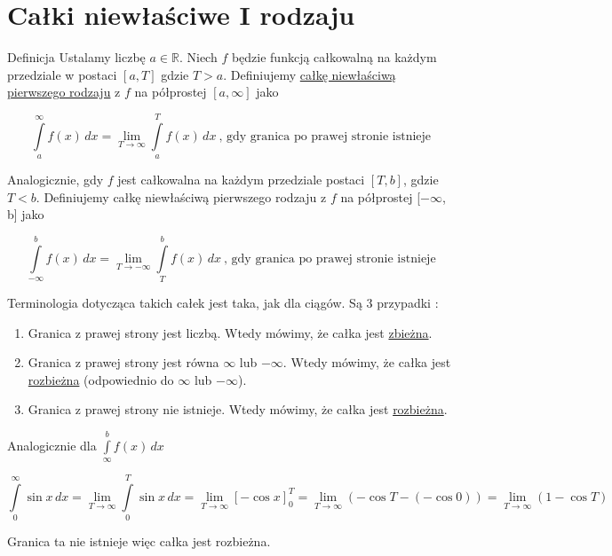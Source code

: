 \chapter{Całki niewłaściwe I rodzaju}

\begin{tw}{Definicja}
    Ustalamy liczbę $a \in \mathbb{R}$. Niech $f$ będzie funkcją całkowalną na każdym przedziale \linebreak w postaci $[a, T]$
    gdzie $T > a$. Definiujemy \underline{całkę niewłaściwą pierwszego rodzaju} z $f$ na półprostej $[a, \infty]$ jako

    \[ \int\limits_{a}^{\infty} f(x) \,dx = \lim_{T \to \infty} \int\limits_{a}^{T} f(x) \,dx \ \text{,  gdy granica po prawej stronie istnieje} \]

    Analogicznie, gdy $f$ jest całkowalna na każdym przedziale postaci $[T, b]$, gdzie $T < b$. Definiujemy całkę niewłaściwą
    pierwszego rodzaju z $f$ na półprostej [$-\infty$, b] jako

    \[ \int\limits_{-\infty}^{b} f(x) \,dx = \lim_{T \to -\infty} \int\limits_{T}^{b} f(x) \,dx \ \text{,  gdy granica po prawej stronie istnieje} \]

\end{tw}

Terminologia dotycząca takich całek jest taka, jak dla ciągów. Są 3 przypadki :

\begin{enumerate}
    \item Granica z prawej strony jest liczbą. Wtedy mówimy, że całka jest \underline{zbieżna}.
    \item Granica z prawej strony jest równa $\infty$ lub $-\infty$. Wtedy mówimy, że całka jest \underline{rozbieżna} (odpowiednio do $\infty$ lub $-\infty$).
    \item Granica z prawej strony nie istnieje. Wtedy mówimy, że całka jest \underline{rozbieżna}.
\end{enumerate}

Analogicznie dla $ \int\limits_{\infty}^{b} f(x)\,dx $

\begin{przyklad}
$$ \int\limits_{0}^{\infty} \sin x \,dx = \lim_{T \to \infty} \int\limits_{0}^{T} \sin x \,dx = 
\lim_{T \to \infty} [-\cos x]_0^T = \lim_{T \to \infty} (-\cos T - (- \cos 0)) = \lim_{T \to \infty} (1 - \cos T) $$

Granica ta nie istnieje więc całka jest rozbieżna. 
\end{przyklad}

